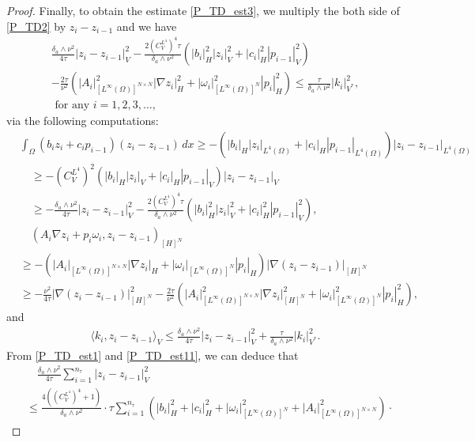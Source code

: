 \documentclass{sinst}
\numberwithin{equation}{section}
\theoremstyle{plain}
\theoremstyle{definition}
\def\dual#1{\langle #1 \rangle}
\begin{document}
\begin{proof}
  Finally, to obtain the estimate \eqref{P_TD_est3}, we multiply the both side of \eqref{P_TD2} by $z_i - z_{i-1}$ and we have
  \begin{gather}
    \frac{\delta_a \wedge \nu^2}{4\tau}|z_i - z_{i-1}|_V^2 - \frac{2(C_V^{L^4})^4 \tau}{\delta_a \wedge \nu^2}(|b_i|_H^2 |z_i|_V^2+ |c_i|_H^2 |p_{i-1}|_V^2)
    \\
    -\frac{2\tau}{\nu^2}(|A_i|_{[L^\infty(\Omega)]^{N \times N}}^2 |\nabla z_i|_H^2 + |\omega_i|_{[L^\infty(\Omega)]^N}^2 |p_i|_H^2) \leq \frac{\tau}{\delta_a \wedge \nu^2} |k_i|_{V^*}^2, \label{P_TD_est11}
    \\
    \mbox{ for any } i = 1,2,3,\dots,
  \end{gather}
  via the following computations:
  \begin{align}
    &\int_\Omega (b_i z_i + c_i p_{i-1})(z_i - z_{i-1})\,dx \geq - (|b_i|_H |z_i|_{L^4(\Omega)} + |c_i|_H |p_{i-1}|_{L^4(\Omega)}) |z_i - z_{i-1}|_{L^4(\Omega)}
    \\
    &\quad \geq -(C_V^{L^4})^2 (|b_i|_H |z_i|_V + |c_i|_H |p_{i-1}|_V) |z_i - z_{i-1}|_V
    \\
    &\quad \geq -\frac{\delta_a \wedge \nu^2}{4\tau}|z_i - z_{i-1}|_V^2 - \frac{2(C_V^{L^4})^4 \tau}{\delta_a \wedge \nu^2}(|b_i|_H^2 |z_i|_V^2 + |c_i|_H^2 |p_{i-1}|_V^2),
  \end{align}
  \begin{align}
    &\quad(A_i \nabla z_i + p_i \omega_i, z_i - z_{i-1})_{[H]^N} 
    \\
    &\geq -(|A_i|_{[L^\infty(\Omega)]^{N \times N}}|\nabla z_i|_H + |\omega_i|_{[L^\infty(\Omega)]^N} |p_i|_H)|\nabla (z_i - z_{i-1})|_{[H]^N}
    \\
    &\geq -\frac{\nu^2}{4\tau} |\nabla (z_i - z_{i-1})|_{[H]^N}^2 - \frac{2\tau}{\nu^2} (|A_i|_{[L^\infty(\Omega)]^{N \times N}}^2 |\nabla z_i|_{[H]^N}^2 + |\omega_i|_{[L^\infty(\Omega)]^N}^2 |p_i|_H^2),
  \end{align}
  and
  \begin{gather}
    \dual{k_i, z_i - z_{i-1}}_V \leq \frac{\delta_a \wedge \nu^2}{4\tau}|z_i - z_{i-1}|_V^2 + \frac{\tau}{\delta_a \wedge \nu^2}|k_i|_{V^*}^2.
  \end{gather}
  From \eqref{P_TD_est1} and \eqref{P_TD_est11}, we can deduce that
  \begin{align}
    &\quad \frac{\delta_a \wedge \nu^2}{4\tau}\sum_{i=1}^{n_\tau}|z_i - z_{i-1}|_V^2
    \\
    &\leq \frac{4((C_V^{L^4})^4 + 1)}{\delta_a \wedge \nu^2} \cdot \tau \sum_{i=1}^{n_\tau}(|b_i|_H^2 + |c_i|_H^2 + |\omega_i|_{[L^\infty(\Omega)]^N}^2 + |A_i|_{[L^\infty(\Omega)]^{N \times N}}^2) \cdot

\end{align}
\end{proof}
\end{document}
